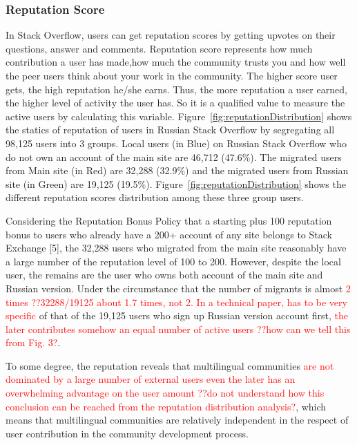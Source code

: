 \subsubsection{Reputation Score}
In Stack Overflow, users can get reputation scores by getting upvotes on their questions, answer and comments. Reputation score represents how much contribution a user has made,how much the community trusts you and how well the peer users think about your work in the community.
The higher score user gets, the high reputation he/she earns. Thus, the more reputation a user earned, the higher level of activity the user has. So it is a qualified value to measure the active users by calculating this variable. Figure~\ref{fig:reputationDistribution} shows the statics of reputation of users in Russian Stack Overflow by segregating all 98,125 users into 3 groups. Local users (in Blue) on Russian Stack Overflow who do not own an account of the main site are 46,712 (47.6\%). The migrated users from Main site (in Red) are 32,288 (32.9\%) and the migrated users from Russian site (in Green) are 19,125 (19.5\%). Figure~\ref{fig:reputationDistribution} shows the different reputation scores distribution among these three group users.

Considering the Reputation Bonus Policy that a starting plus 100 reputation bonus 
to users who already have a 200+ account of any site belongs to Stack Exchange [5], the 32,288  users who migrated from the main site reasonably have a large number of 
the reputation level of 100 to 200. However, despite the local user, the remains are 
the user who owns both account of the main site and Russian version. Under the 
circumstance that the number of migrants is almost \textcolor{red}{2 times ??32288/19125 about 1.7 times, not 2. In a technical paper, has to be very specific} of that of the 19,125 users 
who sign up Russian version account first, \textcolor{red}{the later contributes somehow an equal 
number of active users ??how can we tell this from Fig. 3?}.

To some degree, the reputation reveals that multilingual communities \textcolor{red}{are not dominated 
by a large number of external users even the later has an overwhelming advantage 
on the user amount ??do not understand how this conclusion can be reached from the reputation distribution analysis?}, which means that multilingual communities are relatively 
independent in the respect of user contribution in the community development process.



